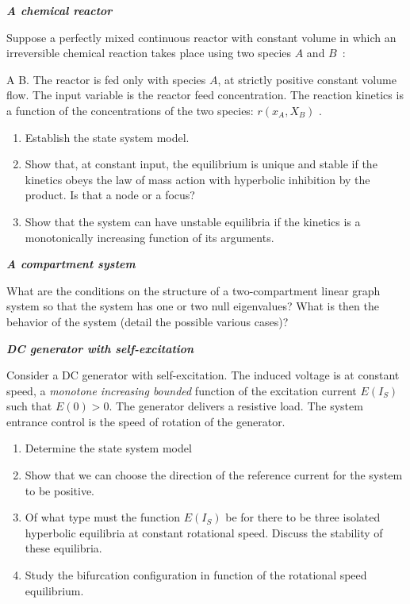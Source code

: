 {\begin{exercice}{\bf \em A chemical reactor}

Suppose a perfectly mixed continuous reactor with constant volume 
in which an irreversible chemical reaction takes place 
using two species $A$ and $B$~:

\eqnn
A \longrightarrow B.
\eeqnn
The reactor is fed only with species $A$, at 
strictly positive constant volume flow. The input variable is
the reactor feed concentration. The reaction kinetics
is a function of the concentrations of the two species: $r(x_A,X_B)$ .

\begin{enumerate}
\item Establish the state system model.
\item Show that, at constant input, the equilibrium is unique and
stable if the kinetics obeys the law of mass action with hyperbolic inhibition
by the product. Is that a node or a focus?

\item Show that the system can have unstable equilibria 
if the kinetics is a monotonically increasing function of its
arguments.
\end{enumerate}
\end{exercice}
\vv

\begin{exercice} {\bf \em A compartment system}

What are the conditions on the structure of a two-compartment linear graph system so that the system has
one or two null eigenvalues? What is then the behavior of the
system (detail the possible various cases)?

\end{exercice}
\vv

\begin{exercice}{\bf \em DC generator with self-excitation}

Consider a DC generator with self-excitation. The induced voltage is at constant speed, a {\em monotone increasing bounded} 
function of  the excitation current $E( I_S)$ such that $E(0)>0$. 
The generator delivers a resistive load. The system entrance control is the speed of rotation of the
generator.

\begin{enumerate}
\item Determine the state system model
\item Show that we can choose the direction of the reference current for the system to be positive.
\item Of what type must the function $E(I_S)$ be for there to be three
isolated hyperbolic equilibria at constant rotational speed. Discuss the stability of these equilibria.
\item Study the bifurcation configuration in function of the rotational speed equilibrium.
\end{enumerate}
\end{exercice}
\vv

}
